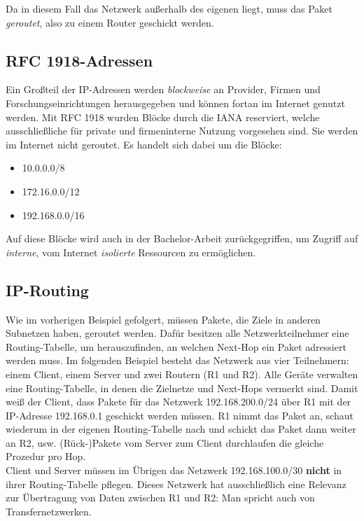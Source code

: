 Da in diesem Fall das Netzwerk außerhalb des eigenen liegt, muss das Paket \textit{geroutet}, also zu einem Router geschickt werden.

\subsection{RFC 1918-Adressen}
Ein Großteil der IP-Adressen werden \textit{blockweise} an Provider, Firmen und Forschungseinrichtungen herausgegeben und können fortan im Internet genutzt werden. Mit RFC 1918  wurden Blöcke durch die IANA reserviert, welche ausschließliche für private und firmeninterne Nutzung vorgesehen sind. Sie werden im Internet nicht geroutet. Es handelt sich dabei um die Blöcke:
\begin{itemize}
\item 10.0.0.0/8
\item 172.16.0.0/12
\item 192.168.0.0/16
\end{itemize}

Auf diese Blöcke wird auch in der Bachelor-Arbeit zurückgegriffen, um Zugriff auf \textit{interne}, vom Internet \textit{isolierte} Ressourcen zu ermöglichen.

\subsection{IP-Routing}

Wie im vorherigen Beispiel gefolgert, müssen Pakete, die Ziele in anderen Subnetzen haben, geroutet werden. Dafür besitzen alle Netzwerkteilnehmer eine Routing-Tabelle, um herauszufinden, an welchen \glqq Next-Hop\grqq{} ein Paket adressiert werden muss. Im folgenden Beispiel besteht das Netzwerk aus vier Teilnehmern: einem Client, einem Server und zwei Routern (R1 und R2). Alle Geräte verwalten eine Routing-Tabelle, in denen die Zielnetze und Next-Hops vermerkt sind.
Damit weiß der Client, dass Pakete für das Netzwerk 192.168.200.0/24 über R1 mit der IP-Adresse 192.168.0.1 geschickt werden müssen. R1 nimmt das Paket an, schaut wiederum in der eigenen Routing-Tabelle nach und schickt das Paket dann weiter an R2, usw. (Rück-)Pakete vom Server zum Client durchlaufen die gleiche Prozedur pro Hop.\\
Client und Server müssen im Übrigen das Netzwerk 192.168.100.0/30 \textbf{nicht} in ihrer Routing-Tabelle pflegen. Dieses Netzwerk hat ausschließlich eine Relevanz zur Übertragung von Daten zwischen R1 und R2: Man spricht auch von Transfernetzwerken.\\

